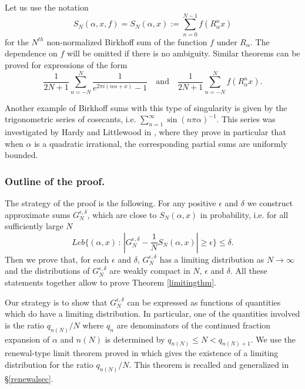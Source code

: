 \documentclass{conm-p-l}
\numberwithin{equation}{section}
\begin{document}
Let us use the notation \begin{equation}\label{BS} {S_{{N}}({\alpha}, {x,f})}= {S_{{N}}({\alpha}, {x})} :=
\sum_{n=0}^{N-1} f(R^n_{\alpha} x) \end{equation} for the $N^{th}$
non-normalized Birkhoff sum of the function $f$ under
$R_{\alpha}$. The dependence on $f$ will be omitted if there is no ambiguity. Similar theorems can be proved for expressions of
the form
\begin{equation*}
\frac{1}{2N+1}\sum_{n=-N}^N  \frac{1}{e^{2\pi i (n\alpha + x)} -1 }\quad
\mathrm{ and} \quad \frac{1}{2N+1}\sum_{n=-N}^{N} f(R_{\alpha}^n x).
\end{equation*}

Another example of Birkhoff sums with this type of singularity is given by the trigonometric series of cosecants, i.e. $\sum_{n=1}^{\infty} \sin(n\pi \alpha)^{-1}$. This series was investigated by Hardy and Littlewood in \cite{HL:som}, where they prove in particular that when $\alpha$ is a quadratic irrational, the corresponding partial sums are uniformly bounded. 
     
\subsubsection*{Outline of the proof.}
The strategy of the proof is the following. For any positive
$\epsilon$ and $\delta$ we construct approximate sums
$G^{\epsilon, \delta}_N$, which are close to ${S_{{N}}({\alpha}, {x})}$
in probability, i.e. for all sufficiently large $N$~ \begin{equation*}
 Leb  \{ (\alpha,x) {\, : \, } \left| G^{\epsilon, \delta}_N -
\frac{1}{N}{S_{{N}}({\alpha}, {x})}\right| \geq \epsilon \} \leq \delta.
\end{equation*}
Then we prove that, for each $\epsilon$  and $\delta $,
$G^{\epsilon, \delta}_N$ has a limiting distribution as
$N\rightarrow \infty$ and  the distributions of $G^{\epsilon,
\delta}_N$ are weakly compact in $N$,  $\epsilon$  and $\delta $.
All these statements together allow to prove Theorem \ref{limitingthm}.

Our strategy is to show that $G^{\epsilon, \delta}_N$ 
 can be expressed as
 functions of quantities which do have a limiting
distribution.
 In particular, one of the quantities involved is the ratio $q_{n(N)}/N$ where
$q_n$ are denominators of the continued fraction expansion of $\alpha$ and $n(N)$ is determined by 
$q_{n(N)} \leq N < q_{n(N)+1}$. We  use the renewal-type limit theorem  proved
in \cite{SU:ren} which gives the existence of a limiting distribution for the
ratio $q_{n(N)}/N$. This theorem is recalled and generalized in
\S\ref{renewalsec}.
\end{document}
